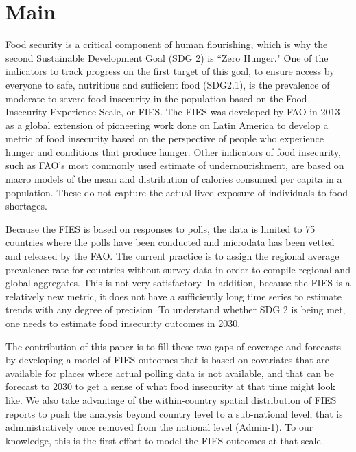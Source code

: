 \documentclass{article}
\begin{document}
\section{Main}
Food security is a critical component of human flourishing, which is why the second Sustainable Development Goal (SDG 2) is “Zero Hunger." One of the indicators to track progress on the first target of this goal, to ensure access by everyone to safe, nutritious and sufficient food (SDG2.1), is the prevalence of moderate to severe food insecurity in the population based on the Food Insecurity Experience Scale, or FIES. The FIES was developed by FAO in 2013 as a global extension of pioneering work done on Latin America to develop a metric of food insecurity based on the perspective of people who experience hunger and conditions that produce hunger. Other indicators of food insecurity, such as FAO's most commonly used estimate of undernourishment, are based on macro models of the mean and distribution of calories consumed per capita in a population. These do not capture the actual lived exposure of individuals to food shortages. 

Because the FIES is based on responses to polls, the data is limited to 75 countries where the polls have been conducted and microdata has been vetted and released by the FAO. The current practice is to assign the regional average prevalence rate for countries without survey data in order to compile regional and global aggregates. This is not very satisfactory. In addition, because the FIES is a relatively new metric, it does not have a sufficiently long time series to estimate trends with any degree of precision. To understand whether SDG 2 is being met, one needs to estimate food insecurity outcomes in 2030. 

The contribution of this paper is to fill these two gaps of coverage and forecasts by developing a model of FIES outcomes that is based on covariates that are available for places where actual polling data is not available, and that can be forecast to 2030 to get a sense of what food insecurity at that time might look like. We also take advantage of the within-country spatial distribution of FIES reports to push the analysis beyond country level to a sub-national level, that is administratively once removed from the national level (Admin-1). To our knowledge, this is the first effort to model the FIES outcomes at that scale.
\end{document}
